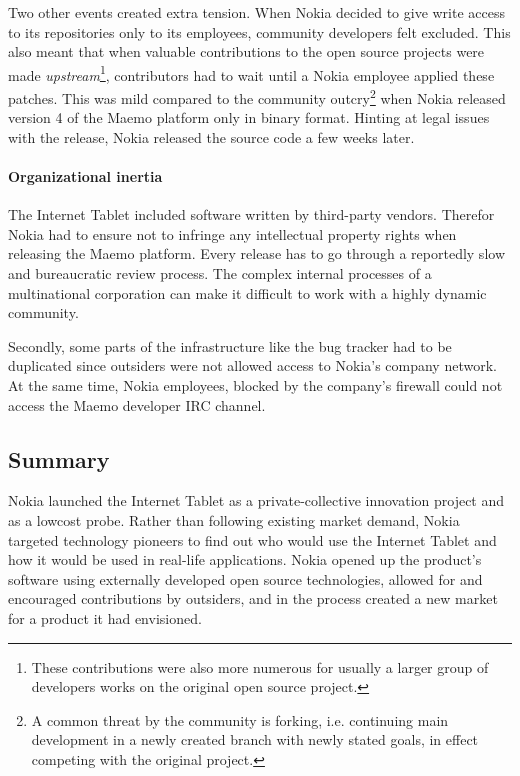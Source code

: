 \documentclass[a4paper]{scrartcl}
\begin{document}
Two other events created extra tension.
When Nokia decided to give write access to its repositories only to its employees, community developers felt excluded.
This also meant that when valuable contributions to the open source projects were made \emph{upstream}\footnote{These contributions were also more numerous for usually a larger group of developers works on the original open source project.}, contributors had to wait until a Nokia employee applied these patches.
This was mild compared to the community outcry\footnote{A common threat by the community is  forking, i.e. continuing main development in a newly created branch with newly stated goals, in effect competing with the original project.} when Nokia released version 4 of the Maemo platform only in binary format.
Hinting at legal issues with the release, Nokia released the source code a few weeks later.

\paragraph{Organizational inertia}
The Internet Tablet included software written by third-party vendors.
Therefor Nokia had to ensure not to infringe any intellectual property rights when releasing the Maemo platform.
Every release has to go through a reportedly slow and bureaucratic review process.
The complex internal processes of a multinational corporation can make it difficult to work with a highly dynamic community.

Secondly, some parts of the infrastructure like the bug tracker had to be duplicated since outsiders were not allowed access to Nokia's company network.
At the same time, Nokia employees, blocked by the company's firewall could not access the Maemo developer IRC channel.


\subsection{Summary}

Nokia launched the Internet Tablet as a private-collective innovation project and as a lowcost probe.
Rather than following existing market demand, Nokia targeted technology pioneers to find out who would use the Internet Tablet and how it would be used in real-life applications.
Nokia opened up the product’s software using externally developed open source technologies, allowed for and encouraged contributions by outsiders, and in the process created a new market for a product it had envisioned.
\end{document}
